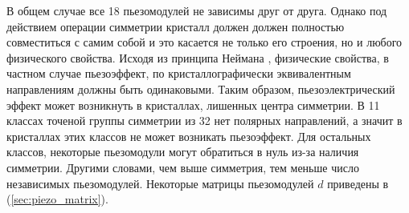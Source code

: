 В общем случае все 18 пьезомодулей не зависимы друг от друга. Однако
под действием операции симметрии кристалл должен должен полностью совместиться с
самим собой и это касается не только его строения, но и любого физического свойства.
Исходя из принципа Неймана \cite{Shaskolska_1984}, физические свойства, в частном случае
пьезоэффект, по кристаллографически эквивалентным направлениям должны быть одинаковыми.
Таким образом, пьезоэлектрический эффект может возникнуть в кристаллах, лишенных центра
симметрии. В 11 классах точеной группы симметрии из 32 нет полярных направлений,
а значит в кристаллах этих классов не может возникать пьезоэффект. Для остальных
классов, некоторые пьезомодули могут обратиться в нуль из-за наличия симметрии.
Другими словами, чем выше симметрия, тем меньше число независимых пьезомодулей.
Некоторые матрицы пьезомодулей $d$ приведены в (\ref{sec:piezo_matrix}).
